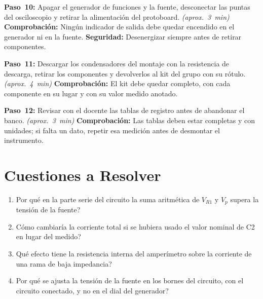 \documentclass[12pt]{article}
\begin{document}
\begin{pasos}
  \item \textbf{Paso~10:} Apagar el generador de funciones y la fuente, desconectar las puntas del osciloscopio y retirar la alimentación del protoboard. \emph{(aprox.~\SI{3}{\minute})} \textbf{Comprobación:} Ningún indicador de salida debe quedar encendido en el generador ni en la fuente. \textbf{Seguridad:} Desenergizar siempre antes de retirar componentes.
  \item \textbf{Paso~11:} Descargar los condensadores del montaje con la resistencia de descarga, retirar los componentes y devolverlos al kit del grupo con su rótulo. \emph{(aprox.~\SI{4}{\minute})} \textbf{Comprobación:} El kit debe quedar completo, con cada componente en su lugar y con su valor medido anotado.
  \item \textbf{Paso~12:} Revisar con el docente las tablas de registro antes de abandonar el banco. \emph{(aprox.~\SI{3}{\minute})} \textbf{Comprobación:} Las tablas deben estar completas y con unidades; si falta un dato, repetir esa medición antes de desmontar el instrumento.
\end{pasos}

\section{Cuestiones a Resolver}\label{sec:cuestiones}
\begin{enumerate}
  \item \textquestiondown{}Por qué en la parte serie del circuito la suma aritmética de $V_{R1}$ y $V_p$ supera la tensión de la fuente?
  \item \textquestiondown{}Cómo cambiaría la corriente total si se hubiera usado el valor nominal de C2 en lugar del medido?
  \item \textquestiondown{}Qué efecto tiene la resistencia interna del amperímetro sobre la corriente de una rama de baja impedancia?
  \item \textquestiondown{}Por qué se ajusta la tensión de la fuente en los bornes del circuito, con el circuito conectado, y no en el dial del generador?
\end{enumerate}

\end{document}
